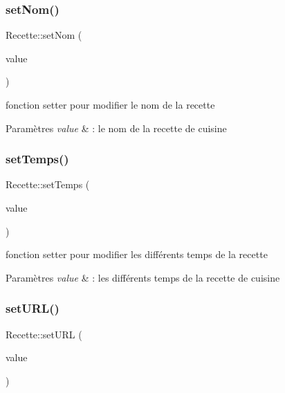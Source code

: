 \subsubsection{\texorpdfstring{set\+Nom()}{setNom()}}
{\footnotesize\ttfamily Recette\+::set\+Nom (\begin{DoxyParamCaption}\item[{const Q\+String \&}]{value }\end{DoxyParamCaption})}



fonction setter pour modifier le nom de la recette 


\begin{DoxyParams}{Paramètres}
{\em value} & \+: le nom de la recette de cuisine \\
\hline
\end{DoxyParams}
\mbox{\label{classRecette_a51b797af44e9bc45811e44bd42f461af}} 
\subsubsection{\texorpdfstring{set\+Temps()}{setTemps()}}
{\footnotesize\ttfamily Recette\+::set\+Temps (\begin{DoxyParamCaption}\item[{const Q\+String \&}]{value }\end{DoxyParamCaption})}



fonction setter pour modifier les différents temps de la recette 


\begin{DoxyParams}{Paramètres}
{\em value} & \+: les différents temps de la recette de cuisine \\
\hline
\end{DoxyParams}
\mbox{\label{classRecette_ac910b38482d259cba788f41669e765b1}} 
\subsubsection{\texorpdfstring{set\+U\+R\+L()}{setURL()}}
{\footnotesize\ttfamily Recette\+::set\+U\+RL (\begin{DoxyParamCaption}\item[{const Q\+String \&}]{value }\end{DoxyParamCaption})}



